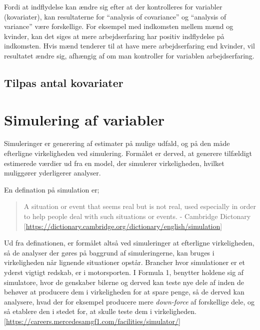 \documentclass[]{book}
\theoremstyle{definition}
\theoremstyle{definition}
\theoremstyle{definition}
\theoremstyle{remark}
\begin{document}
Fordi at indflydelse kan ændre sig efter at der kontrolleres for variabler (kovariater), kan resultaterne for ``analysis of covariance'' og ``analysis of variance'' være forskellige. For eksempel med indkomsten mellem mænd og kvinder, kan det siges at mere arbejdserfaring har positiv indflydelse på indkomsten. Hvis mænd tenderer til at have mere arbejdserfaring end kvinder, vil resultatet ændre sig, afhængig af om man kontroller for variablen arbejdserfaring.

\hypertarget{tilpas-antal-kovariater}{%
\section{Tilpas antal kovariater}\label{tilpas-antal-kovariater}}

\hypertarget{simulering-af-variabler}{%
\chapter{Simulering af variabler}\label{simulering-af-variabler}}

Simuleringer er generering af estimater på mulige udfald, og på den måde efterligne virkeligheden ved simulering. Formålet er derved, at generere tilfældigt estimerede værdier ud fra en model, der simulerer virkeligheden, hvilket muliggører yderligerer analyser.

En defination på simulation er;

\begin{quote}
A situation or event that seems real but is not real, used especially in order to help people deal with such situations or events. - Cambridge Dictonary {[}\url{https://dictionary.cambridge.org/dictionary/english/simulation}{]}
\end{quote}

Ud fra definationen, er formålet altså ved simuleringer at efterligne virkeligheden, så de analyser der gøres på baggrund af simuleringerne, kan bruges i virkeligheden når lignende situationer opstår.
Brancher hvor simulationer er et yderst vigtigt redskab, er i motorsporten. I Formula 1, benytter holdene sig af simulatore, hvor de genskaber bilerne og derved kan teste nye dele af inden de behøver at producere dem i virkeligheden for at spare penge, så de derved kan analysere, hvad der for eksempel producere mere \emph{down-force} af forskellige dele, og så etablere den i stedet for, at skulle teste dem i virkeligheden. {[}\url{https://careers.mercedesamgf1.com/facilities/simulator/}{]}
\end{document}
